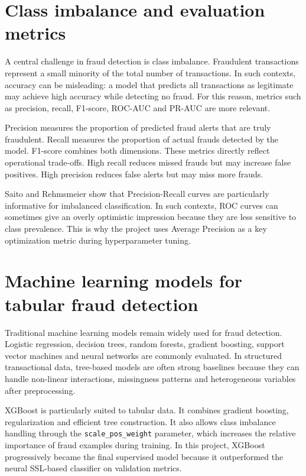 ﻿\documentclass[12pt,a4paper,oneside]{report}
\begin{document}
\section{Class imbalance and evaluation metrics}

A central challenge in fraud detection is class imbalance. Fraudulent transactions represent a small minority of the total number of transactions. In such contexts, accuracy can be misleading: a model that predicts all transactions as legitimate may achieve high accuracy while detecting no fraud. For this reason, metrics such as precision, recall, F1-score, ROC-AUC and PR-AUC are more relevant.

Precision measures the proportion of predicted fraud alerts that are truly fraudulent. Recall measures the proportion of actual frauds detected by the model. F1-score combines both dimensions. These metrics directly reflect operational trade-offs. High recall reduces missed frauds but may increase false positives. High precision reduces false alerts but may miss more frauds.

Saito and Rehmsmeier \cite{saito2015pr} show that Precision-Recall curves are particularly informative for imbalanced classification. In such contexts, ROC curves can sometimes give an overly optimistic impression because they are less sensitive to class prevalence. This is why the project uses Average Precision as a key optimization metric during hyperparameter tuning.

\section{Machine learning models for tabular fraud detection}

Traditional machine learning models remain widely used for fraud detection. Logistic regression, decision trees, random forests, gradient boosting, support vector machines and neural networks are commonly evaluated. In structured transactional data, tree-based models are often strong baselines because they can handle non-linear interactions, missingness patterns and heterogeneous variables after preprocessing.

XGBoost is particularly suited to tabular data. It combines gradient boosting, regularization and efficient tree construction. It also allows class imbalance handling through the \texttt{scale\_pos\_weight} parameter, which increases the relative importance of fraud examples during training. In this project, XGBoost progressively became the final supervised model because it outperformed the neural SSL-based classifier on validation metrics.
\end{document}
